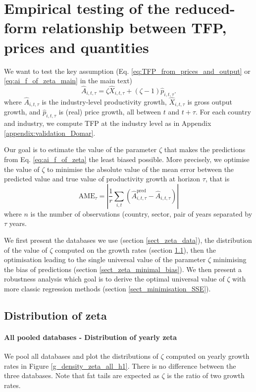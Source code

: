 \documentclass[11pt]{article}
\begin{document}
\section{Empirical testing of the reduced-form relationship between TFP, prices and quantities}
\label{appendix:validation_zeta}

We want to test the key assumption (Eq. \ref{eq:TFP_from_prices_and_output} or \ref{eq:ai_f_of_zeta_main} in the main text)
\begin{equation}
\hat{A}_{i,t,\tau}=\zeta\hat{X}_{i,t,\tau}+(\zeta-1)\hat{p}_{i,t,\tau}.
\label{eq:ai_f_of_zeta}
\end{equation}
where $\hat{A}_{i,t,\tau}$ is the industry-level productivity growth, $\hat{X}_{i,t,\tau}$ is gross output growth,  and $\hat{p}_{i,t,\tau}$ is (real) price growth, all between $t$ and $t+\tau$. For each country and industry, we compute TFP at the industry level as in Appendix \ref{appendix:validation_Domar}.

Our goal is to estimate the value of the parameter $\zeta$ that makes the predictions from Eq. \ref{eq:ai_f_of_zeta} the least biased possible. More precisely, we optimise the value of $\zeta$ to minimise the absolute value of the mean error between the predicted value and true value of productivity growth at horizon $\tau$, that is
\begin{equation}
\label{eq_mean_error_t_t+tau}
    \text{AME}_{\tau}=\left|\frac{1}{r}\sum_{i,t}(\hat{A}^{\text{pred}}_{i,t,\tau}-\hat{A}_{i,t,\tau})\right|
\end{equation}
where $n$ is the number of observations (country, sector, pair of years separated by $\tau$ years.

We first present the databases we use (section \ref{sect_zeta_data}), the distribution of the value of $\zeta$ computed on the growth rates (section \ref{sect_distribution_zeta}), then the optimisation leading to the single universal value of the parameter $\zeta$ minimising the bias of predictions (section \ref{sect_zeta_minimal_bias}).
We then present a robustness analysis which goal is to derive the optimal universal value of $\zeta$ with more classic regression methods (section \ref{sect_minimisation_SSE}).

\subsection{Distribution of zeta}
\label{sect_distribution_zeta}

\paragraph{All pooled databases - Distribution of yearly zeta} We pool all databases and plot the distributions of $\zeta$ computed on yearly growth rates in Figure \ref{g_density_zeta_all_h1}. There is no difference between the three databases. Note that fat tails are expected as $\zeta$ is the ratio of two growth rates.
\end{document}
